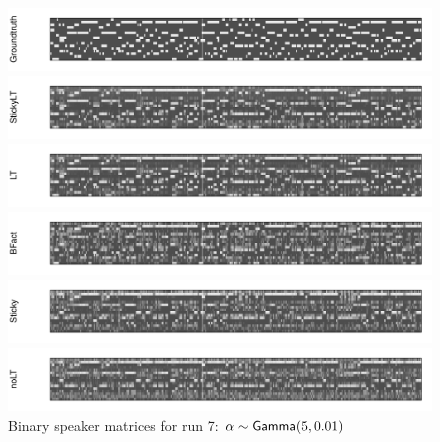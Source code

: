 \begin{figure}[tb]
\begin{center}
  \centerline{\includegraphics[width = \textwidth, height = 0.2\textwidth]{fig/cocktail/synth_s16_m12/hyper_alpha/h10.0_nocs_cp0/a5b0p01/groundtruth.pdf}}
  \centerline{\includegraphics[width = \textwidth, height = 0.2\textwidth]{fig/cocktail/synth_s16_m12/hyper_alpha/h10.0_nocs_cp0/a5b0p01/StickyLT_hdp_hmm_w0_aalpha5_balpha0p01/binary_state.pdf}}
  \centerline{\includegraphics[width = \textwidth, height = 0.2\textwidth]{fig/cocktail/synth_s16_m12/hyper_alpha/h10.0_nocs_cp0/a5b0p01/LT_hdp_hmm_w0_aalpha5_balpha0p01/binary_state.pdf}}
  \centerline{\includegraphics[width = \textwidth, height = 0.2\textwidth]{fig/cocktail/synth_s16_m12/hyper_alpha/h10.0_nocs_cp0/a5b0p01/BFact_hmm_w0_aalpha5_balpha0p01/binary_state.pdf}}
  \centerline{\includegraphics[width = \textwidth, height = 0.2\textwidth]{fig/cocktail/synth_s16_m12/hyper_alpha/h10.0_nocs_cp0/a5b0p01/Sticky_hdp_hmm_w0_aalpha5_balpha0p01/binary_state.pdf}}
  \centerline{\includegraphics[width = \textwidth, height = 0.2\textwidth]{fig/cocktail/synth_s16_m12/hyper_alpha/h10.0_nocs_cp0/a5b0p01/noLT_hdp_hmm_w0_aalpha5_balpha0p01/binary_state.pdf}}
\caption{Binary speaker matrices for run 7: $\alpha \sim \mathsf{Gamma}(5,0.01)$}
\end{center}
\end{figure}

